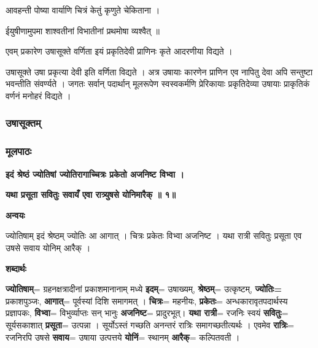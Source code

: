 \documentclass[11pt, a5paper]{article}
\begin{document}
आवहन्ती पोष्या वार्याणि चित्रं केतुं कृणुते चेकिताना ।

ईयुषीणामुपमा शाश्वतीनां विभातीनां प्रथमोषा व्यश्वैत् ॥

एवम् प्रकारेण उषासूक्ते वर्णिता इयं प्रकृतिदेवी प्राणिनः कृते आदरणीया विद्यते ।

उषासूक्ते उषा प्रकृत्या देवी इति वर्णिता विद्यते । अत्र उषायाः कारणेन प्राणिन एव नापितु देवा अपि सन्तुष्टा भवन्तीति संवर्ण्यते । जगतः सर्वान् पदार्थान् मूलरूपेण स्वस्वकर्मणि प्रेरिकायाः प्रकृतिदेव्या उषायाः प्राकृतिकं वर्णनं मनोहरं विद्यते ।

\subsubsection{}

\subsubsection{}

\subsubsection{\textbf{उषासूक्तम्}}

\subsubsection{\textbf{मूलपाठः}}

\textbf{इदं श्रेष्ठं ज्योतिषां ज्योतिरागाच्चित्रः प्रकेतो अजनिष्ट विभ्वा ।}

\textbf{यथा प्रसूता सवितुः सवायँ एवा रात्र्युषसे योनिमारैक् ॥ १॥}

\textbf{अन्वयः}

ज्योतिषाम् इदं  श्रेष्ठम् ज्योतिः आ आगात् । चित्रः प्रकेतः विभ्वा अजनिष्ट । यथा रात्री सवितुः प्रसूता एव उषसे सवाय योनिम् आरैक् ।

\textbf{शब्दार्थः}

\textbf{ज्योतिषाम्}= ग्रहनक्षत्रादीनां प्रकाशमानानाम् मध्ये \textbf{इदम्}= उषाख्यम्,  \textbf{श्रेष्ठम्}= उत्कृष्टम्, \textbf{ज्योतिः=} प्रकाशपुञ्जः, \textbf{आगात्}= पूर्वस्यां दिशि समागमत् । \textbf{चित्रः}= महनीयः, \textbf{प्रकेतः}= अन्धकारावृतपदार्थस्य प्रज्ञापकः, \textbf{विभ्वा}= विभुर्व्याप्तः सन् भानुः \textbf{अजनिष्ट}= प्रादुरभूत्। \textbf{यथा रात्री}= रजनिः स्वयं \textbf{सवितुः}= सूर्यसकाशात् \textbf{प्रसूता}= उत्पन्ना । सूर्योऽस्तं गच्छति अनन्तरं रात्रिः समागच्छतीत्यर्थः । एवमेव \textbf{रात्रिः}= रजनिरपि उषसे \textbf{सवाय}= उषाया उत्पत्तये \textbf{योनिं}= स्थानम् \textbf{आरैक्}= कल्पितवती ।
\end{document}
